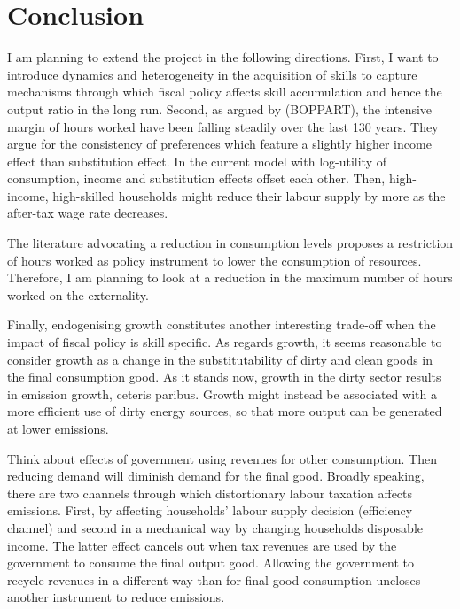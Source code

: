 \section{Conclusion}\label{sec:con}

I am planning to extend the project in the following directions.
First, I want to introduce dynamics and heterogeneity in the acquisition of skills to capture mechanisms through which fiscal policy affects skill accumulation and hence the output ratio in the long run. Second, as argued by (BOPPART), the intensive margin of hours worked have been falling steadily over the last 130 years. They argue for the consistency of preferences which feature a slightly higher income effect than substitution effect. In the current model with log-utility of consumption, income and substitution effects offset each other. Then, high-income, high-skilled households might reduce their labour supply by more as the after-tax wage rate decreases. 

The literature advocating a reduction in consumption levels proposes a restriction of hours worked as policy instrument to lower the consumption of resources. Therefore, I am planning to look at a reduction in the maximum number of hours worked on the externality. 

Finally, endogenising growth constitutes another interesting trade-off when the impact of fiscal policy is skill specific. 
As regards growth, it seems reasonable to consider growth as a change in the substitutability of dirty and clean goods in the final consumption good. As it stands now, growth in the dirty sector results in emission growth, ceteris paribus. Growth might instead be associated with a more efficient use of dirty energy sources, so that more output can be generated at lower emissions.

Think about effects of government using revenues for other consumption. Then reducing demand will diminish demand for the final good. 
Broadly speaking, there are two channels through which distortionary labour taxation affects emissions. First, by affecting households' labour supply decision (efficiency channel) and second in a mechanical way by changing households disposable income. The latter effect cancels out when tax revenues are used by the government to consume the final output good. Allowing the government to recycle revenues in a different way than for final good consumption uncloses another instrument to reduce emissions. 


